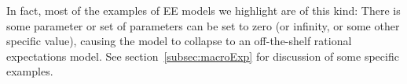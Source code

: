     In fact, most of the examples of EE models we highlight are of this kind: There is some parameter or set of parameters can be set to zero (or infinity, or some other specific value), causing the model to collapse to an off-the-shelf rational expectations model.  See section~\ref{subsec:macroExp} for discussion of some specific examples.

\begin{comment}
    The literature's many informal references to epidemiological ideas indicate  that economists are familiar with these ideas and find them tempting.  The hesitancy to adopt explicitly epidemiological methods in the analysis of standard economic questions therefore seems unlikely to reflect a consensus that there are no plausible epidemiological models; it seems more  likely to reflect a concern that there are too many.  Without considerable further discipline beyond the proposition that `ideas spread like diseases' it is not unreasonable to worry about whether an `epidemiological expectations' approach is sufficiently well defined to be worth exploring.
     ``Rational Expectations'' (`RE') -- which in this context really means `identical expectations' --  remains a default at least partly because it usually can generate unique and testable predictions for the dynamics of aggregate variables.

    But several counterpoints are worth emphasizing.

    The first is that expectations are \textit{measurable}, and increasingly measured in the kinds of micro datasets used to calibrate and simulate HA-macro models.  All survey data (including income and wealth) need to be treated carefully to guard against measurement problems, and the extensive literature on the measurement of expectations suggests that those data should be treated with particular care -- but also demonstrates that robust information is contained in the answers to such questions.

    Thus, EE models have a source of discipline unavailable in the RE framework. This fact could help counter concerns about whether such models provide too many degrees of freedom to be usefully testable.



\end{comment}
